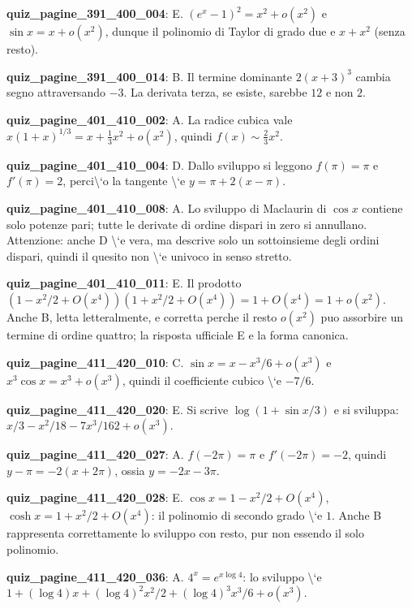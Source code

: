 \documentclass[11pt,a4paper]{article}
\newcounter{quiz}
\begin{document}
\noindent\textbf{quiz\_pagine\_391\_400\_004}: E. $(e^x-1)^2=x^2+o(x^2)$ e $\sin x=x+o(x^2)$, dunque il polinomio di Taylor di grado due e $x+x^2$ (senza resto).\par\medskip
\noindent\textbf{quiz\_pagine\_391\_400\_014}: B. Il termine dominante $2(x+3)^3$ cambia segno attraversando $-3$. La derivata terza, se esiste, sarebbe $12$ e non $2$.\par\medskip
\noindent\textbf{quiz\_pagine\_401\_410\_002}: A. La radice cubica vale $x(1+x)^{1/3}=x+\frac13x^2+o(x^2)$, quindi $f(x)\sim\frac23x^2$.\par\medskip
\noindent\textbf{quiz\_pagine\_401\_410\_004}: D. Dallo sviluppo si leggono $f(\pi)=\pi$ e $f\prime(\pi)=2$, perci\textbackslash{}`o la tangente \textbackslash{}`e $y=\pi+2(x-\pi)$.\par\medskip
\noindent\textbf{quiz\_pagine\_401\_410\_008}: A. Lo sviluppo di Maclaurin di $\cos x$ contiene solo potenze pari; tutte le derivate di ordine dispari in zero si annullano. Attenzione: anche D \textbackslash{}`e vera, ma descrive solo un sottoinsieme degli ordini dispari, quindi il quesito non \textbackslash{}`e univoco in senso stretto.\par\medskip
\noindent\textbf{quiz\_pagine\_401\_410\_011}: E. Il prodotto $(1-x^2/2+O(x^4))(1+x^2/2+O(x^4))=1+O(x^4)=1+o(x^2)$. Anche B, letta letteralmente, e corretta perche il resto $o(x^2)$ puo assorbire un termine di ordine quattro; la risposta ufficiale E e la forma canonica.\par\medskip
\noindent\textbf{quiz\_pagine\_411\_420\_010}: C. $\sin x=x-x^3/6+o(x^3)$ e $x^3\cos x=x^3+o(x^3)$, quindi il coefficiente cubico \textbackslash{}`e $-7/6$.\par\medskip
\noindent\textbf{quiz\_pagine\_411\_420\_020}: E. Si scrive $\log(1+\sin x/3)$ e si sviluppa: $x/3-x^2/18-7x^3/162+o(x^3)$.\par\medskip
\noindent\textbf{quiz\_pagine\_411\_420\_027}: A. $f(-2\pi)=\pi$ e $f\prime(-2\pi)=-2$, quindi $y-\pi=-2(x+2\pi)$, ossia $y=-2x-3\pi$.\par\medskip
\noindent\textbf{quiz\_pagine\_411\_420\_028}: E. $\cos x=1-x^2/2+O(x^4)$, $\cosh x=1+x^2/2+O(x^4)$: il polinomio di secondo grado \textbackslash{}`e $1$. Anche B rappresenta correttamente lo sviluppo con resto, pur non essendo il solo polinomio.\par\medskip
\noindent\textbf{quiz\_pagine\_411\_420\_036}: A. $4^x=e^{x\log4}$: lo sviluppo \textbackslash{}`e $1+(\log4)x+(\log4)^2x^2/2+(\log4)^3x^3/6+o(x^3)$.\par\medskip
\end{document}
